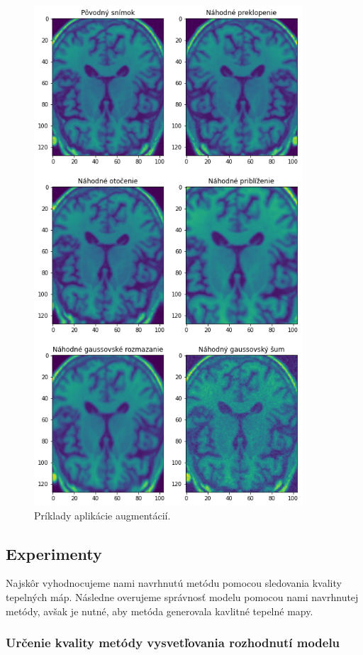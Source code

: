 \begin{figure}[H]
    \centering
    \includegraphics[width=10cm]{assets/images/augmentations.png}
    \caption{Príklady aplikácie augmentácií.}
    \label{fig:augmentations}
\end{figure}


\subsection{Experimenty \label{sec:design_experiments}}

Najskôr vyhodnocujeme nami navrhnutú metódu pomocou sledovania kvality tepelných máp. Následne overujeme správnosť modelu pomocou nami navrhnutej metódy, avšak je nutné, aby metóda generovala kavlitné tepelné mapy.

\subsubsection{Určenie kvality metódy vysvetľovania rozhodnutí modelu \label{sec:evaluation_design_method_quality}}

